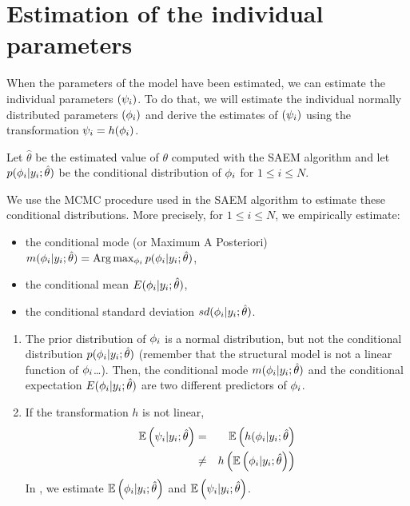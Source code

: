 \section{Estimation of the individual parameters} \label{section_indivparam}

When the parameters of the model have been estimated, we can estimate the individual parameters $({\psi_i})$. To do that, we will estimate the individual normally distributed parameters $({{\phi}_i})$ and derive the estimates of $({\psi_i})$ using the transformation ${\psi_i}= h({{\phi}_i})$.

Let $\hat{\theta}$ be the estimated value of $\theta$ computed with the SAEM algorithm and let $p({{\phi}_i}|y_i;\hat{\theta})$ be the conditional distribution of ${{\phi}_i}$ for $1\leq i \leq N$.

We use the MCMC procedure used in the SAEM algorithm to estimate these conditional distributions. More precisely, for $1\leq i \leq N$, we empirically estimate:

\begin{itemize}
  \item the conditional mode (or Maximum A Posteriori)
  $ m({{\phi}_i}|y_i;\hat{\theta})={\rm Arg}\max_{{\phi}_i} p({{\phi}_i}|y_i;\hat{\theta})$,
  \item the conditional mean
  $ E({{\phi}_i}|y_i;\hat{\theta})$,
  \item the conditional standard deviation
 $ sd({{\phi}_i}|y_i;\hat{\theta})$.
 \end{itemize}

 \begin{enumerate}
  \item The prior distribution of ${{\phi}_i}$ is a normal distribution, but not the conditional distribution $p({{\phi}_i}|y_i;\hat{\theta})$ (remember that the structural model is not a linear function of ${{\phi}_i}$\ldots). Then, the conditional mode $m({{\phi}_i}|y_i;\hat{\theta})$ and the conditional expectation $ E({{\phi}_i}|y_i;\hat{\theta})$ are two different predictors of ${{\phi}_i}$.
  \item If the transformation $h$ is not linear,
      \begin{eqnarray*}
       \mathbb{E}\left({\psi_i}|y_i;\hat{\theta}\right) &=&  \mathbb{E}\left(h({{\phi}_i}|y_i;\hat{\theta}\right) \\
       &\neq& h\left(\mathbb{E}\left({{\phi}_i}|y_i;\hat{\theta}\right)  \right)
       \end{eqnarray*}
       In \saemix, we estimate $\mathbb{E}\left({{\phi}_i}|y_i;\hat{\theta}\right)$ and $\mathbb{E}\left({\psi_i}|y_i;\hat{\theta}\right)$.
\end{enumerate}

